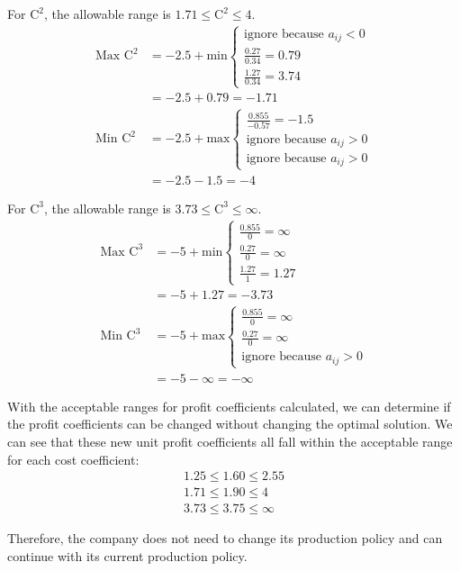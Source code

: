 For $\text{C}^2$, the allowable range is $1.71 \leq \text{C}^2 \leq 4$.
\begin{align*}
\text{Max }\text{C}^2 &= -2.5 + \text{min}
\begin{cases}
	\text{ignore because } a_{ij} < 0 \\
	\frac{0.27}{0.34} = 0.79 \\
	\frac{1.27}{0.34} = 3.74
\end{cases}\\
&= -2.5 + 0.79 = -1.71\\
\text{Min }\text{C}^2 &= -2.5 + \text{max}
\begin{cases}
	\frac{0.855}{-0.57} = -1.5 \\
	\text{ignore because } a_{ij} > 0 \\
	\text{ignore because } a_{ij} > 0
\end{cases}\\
&= -2.5 - 1.5 = -4
\end{align*}

For $\text{C}^3$, the allowable range is $3.73 \leq \text{C}^3 \leq \infty$.
\begin{align*}
\text{Max }\text{C}^3 &= -5 + \text{min}
\begin{cases}
	\frac{0.855}{0} = \infty \\
	\frac{0.27}{0} = \infty \\
	\frac{1.27}{1} = 1.27
\end{cases}\\
&= -5 + 1.27 = -3.73\\
\text{Min }\text{C}^3 &= -5 + \text{max}
\begin{cases}
	\frac{0.855}{0} = \infty \\
	\frac{0.27}{0} = \infty \\
	\text{ignore because } a_{ij} > 0  
\end{cases}\\
&= -5 - \infty = -\infty
\end{align*}

With the acceptable ranges for profit coefficients calculated, we can determine if the profit coefficients can be changed without changing the optimal solution. We can see that these new unit profit coefficients all fall within the acceptable range for each cost coefficient:
\begin{gather*}	
	1.25 \leq 1.60 \leq 2.55 \\
	1.71 \leq 1.90 \leq 4 \\
	3.73 \leq 3.75 \leq \infty
\end{gather*}

Therefore, the company does not need to change its production policy and can continue with its current production policy.